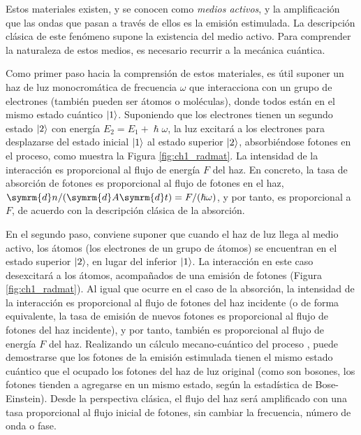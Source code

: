 Estos materiales existen, y se conocen como \emph{medios activos}, y la amplificación que las ondas que pasan a través de ellos es la emisión estimulada. La descripción clásica de este fenómeno supone la existencia del medio activo. Para comprender la naturaleza de estos medios, es necesario recurrir a la mecánica cuántica.

Como primer paso hacia la comprensión de estos materiales, es útil suponer un haz de luz monocromática de frecuencia $\omega$ que interacciona con un grupo de electrones (también pueden ser átomos o moléculas), donde todos están en el mismo estado cuántico $\left|1\right\rangle$. Suponiendo que los electrones tienen un segundo estado $\left|2\right\rangle$ con energía $E_{2} = E_{1} + \hslash \omega$, la luz excitará a los electrones para desplazarse del estado inicial $\left|1\right\rangle$ al estado superior $\left|2\right\rangle$, absorbiéndose fotones en el proceso, como muestra la Figura \ref{fig:ch1_radmat}. La intensidad de la interacción es proporcional al flujo de energía $F$ del haz. En concreto, la tasa de absorción de fotones es proporcional al flujo de fotones en el haz, $\symrm{d}n/(\symrm{d}A \symrm{d}t) = F/(\hslash \omega)$, y por tanto, es proporcional a $F$, de acuerdo con la descripción clásica de la absorción.

En el segundo paso, conviene suponer que cuando el haz de luz llega al medio activo, los átomos (los electrones de un grupo de átomos) se encuentran en el estado superior $\left|2\right\rangle$, en lugar del inferior $\left|1\right\rangle$. La interacción en este caso desexcitará a los átomos, acompañados de una emisión de fotones (Figura \ref{fig:ch1_radmat}). Al igual que ocurre en el caso de la absorción, la intensidad de la interacción es proporcional al flujo de fotones del haz incidente (o de forma equivalente, la tasa de emisión de nuevos fotones es proporcional al flujo de fotones del haz incidente), y por tanto, también es proporcional al flujo de energía $F$ del haz. Realizando un cálculo mecano-cuántico del proceso \autocite{Schwartz2013}, puede demostrarse que los fotones de la emisión estimulada tienen el mismo estado cuántico que el ocupado los fotones del haz de luz original (como son bosones, los fotones tienden a agregarse en un mismo estado, según la estadística de Bose-Einstein). Desde la perspectiva clásica, el flujo del haz será amplificado con una tasa proporcional al flujo inicial de fotones, sin cambiar la frecuencia, número de onda o fase.

